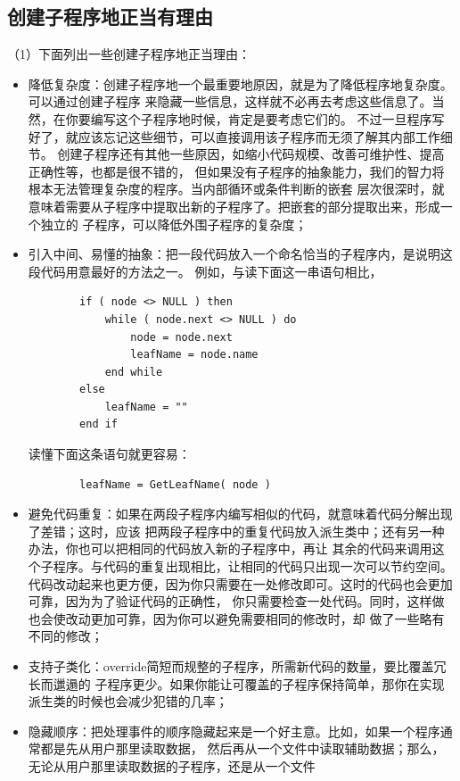 \documentclass{article}
\begin{document}
\subsection{创建子程序地正当有理由}
（1）下面列出一些创建子程序地正当理由：
\begin{itemize}
    \item 降低复杂度：创建子程序地一个最重要地原因，就是为了降低程序地复杂度。可以通过创建子程序
    来隐藏一些信息，这样就不必再去考虑这些信息了。当然，在你要编写这个子程序地时候，肯定是要考虑它们的。
    不过一旦程序写好了，就应该忘记这些细节，可以直接调用该子程序而无须了解其内部工作细节。
    创建子程序还有其他一些原因，如缩小代码规模、改善可维护性、提高正确性等，也都是很不错的，
    但如果没有子程序的抽象能力，我们的智力将根本无法管理复杂度的程序。当内部循环或条件判断的嵌套
    层次很深时，就意味着需要从子程序中提取出新的子程序了。把嵌套的部分提取出来，形成一个独立的
    子程序，可以降低外围子程序的复杂度；
    \item 引入中间、易懂的抽象：把一段代码放入一个命名恰当的子程序内，是说明这段代码用意最好的方法之一。
    例如，与读下面这一串语句相比，
    \begin{lstlisting}
        if ( node <> NULL ) then
            while ( node.next <> NULL ) do
                node = node.next
                leafName = node.name
            end while
        else
            leafName = ""
        end if
    \end{lstlisting}
    读懂下面这条语句就更容易：
    \begin{lstlisting}
        leafName = GetLeafName( node )
    \end{lstlisting}
    \item 避免代码重复：如果在两段子程序内编写相似的代码，就意味着代码分解出现了差错；这时，应该
    把两段子程序中的重复代码放入派生类中；还有另一种办法，你也可以把相同的代码放入新的子程序中，再让
    其余的代码来调用这个子程序。与代码的重复出现相比，让相同的代码只出现一次可以节约空间。
    代码改动起来也更方便，因为你只需要在一处修改即可。这时的代码也会更加可靠，因为为了验证代码的正确性，
    你只需要检查一处代码。同时，这样做也会使改动更加可靠，因为你可以避免需要相同的修改时，却
    做了一些略有不同的修改；
    \item 支持子类化：override简短而规整的子程序，所需新代码的数量，要比覆盖冗长而邋遢的
    子程序更少。如果你能让可覆盖的子程序保持简单，那你在实现派生类的时候也会减少犯错的几率；
    \item 隐藏顺序：把处理事件的顺序隐藏起来是一个好主意。比如，如果一个程序通常都是先从用户那里读取数据，
    然后再从一个文件中读取辅助数据；那么，无论从用户那里读取数据的子程序，还是从一个文件

\end{itemize}
\end{document}
